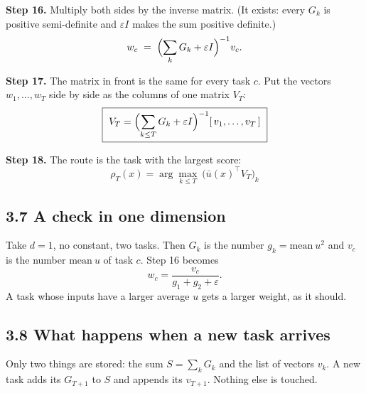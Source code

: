 \documentclass[11pt,a4paper]{article}
\newcommand{\step}[1]{\textbf{Step #1.}}
\newcommand{\ub}{\bar u}
\begin{document}
\step{16} Multiply both sides by the inverse matrix. (It exists: every $G_k$ is positive
semi-definite and $\varepsilon I$ makes the sum positive definite.)
\[ w_c \;=\; \Bigl(\sum_k G_k + \varepsilon I\Bigr)^{-1} v_c . \]

\step{17} The matrix in front is the same for every task $c$. Put the vectors $w_1,\dots,w_T$ side
by side as the columns of one matrix $V_T$:
\[ \boxed{\ V_T = \Bigl(\sum_{k \le T} G_k + \varepsilon I\Bigr)^{-1} [\,v_1,\dots,v_T\,]\ } \]

\step{18} The route is the task with the largest score:
\[ \boxed{\ \rho_T(x) = \arg\max_{k \le T}\ \bigl(\ub(x)^{\top} V_T\bigr)_k\ } \]

\begin{center}
\end{center}

\subsection*{3.7 A check in one dimension}

Take $d=1$, no constant, two tasks. Then $G_k$ is the number $g_k = \text{mean}\ u^2$ and $v_c$ is the
number $\text{mean}\ u$ of task $c$. Step 16 becomes
\[ w_c = \frac{v_c}{g_1 + g_2 + \varepsilon} . \]
A task whose inputs have a larger average $u$ gets a larger weight, as it should.

\subsection*{3.8 What happens when a new task arrives}

Only two things are stored: the sum $S=\sum_k G_k$ and the list of vectors $v_k$.
A new task adds its $G_{T+1}$ to $S$ and appends its $v_{T+1}$. Nothing else is touched.

\begin{center}
\end{center}
\end{document}
